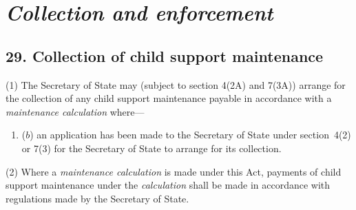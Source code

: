 \documentclass[12pt,a4paper]{article}
\begin{document}
\section{\itshape Collection and enforcement}

\subsection{29. Collection of child support maintenance}

(1) The 
Secretary of State  %
may 
(subject to section 4(2A) and 7(3A))  %
arrange for the collection of any child support maintenance payable in accordance with a 
\emph{maintenance calculation}  %
where—
\begin{enumerate}\item[]

($b$) an application has been made to the 
Secretary of State  %
under section~4(2)  or 7(3)  for 
the Secretary of State  %
to arrange for its collection.
\end{enumerate}

(2) Where a 
\emph{maintenance calculation}  %
is made under this Act, payments of child support maintenance under the 
\emph{calculation}  %
shall be made in accordance with regulations made by the Secretary of State.
\end{document}
